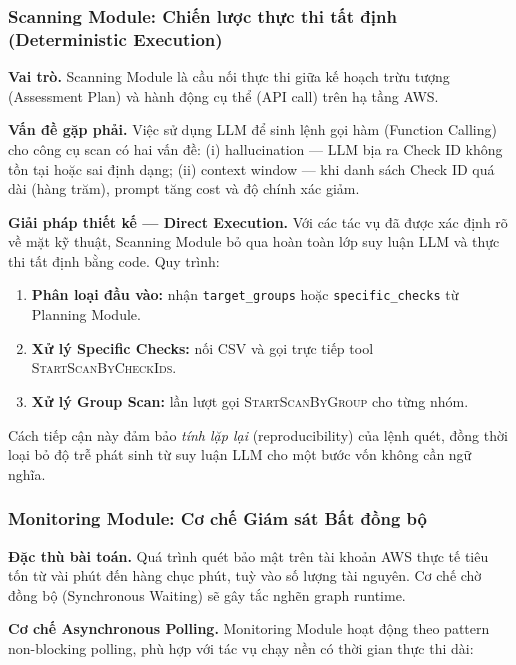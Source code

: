 \subsubsection*{Scanning Module: Chiến lược thực thi tất định (Deterministic Execution)}
\label{subsec:scanner_module}
\label{sub:scanner_strategy}

\textbf{Vai trò.} Scanning Module là cầu nối thực thi giữa kế hoạch trừu tượng (Assessment Plan) và hành động cụ thể (API call) trên hạ tầng AWS.

\textbf{Vấn đề gặp phải.} Việc sử dụng LLM để sinh lệnh gọi hàm (Function Calling) cho công cụ scan có hai vấn đề: (i) hallucination — LLM bịa ra Check ID không tồn tại hoặc sai định dạng; (ii) context window — khi danh sách Check ID quá dài (hàng trăm), prompt tăng cost và độ chính xác giảm.

\textbf{Giải pháp thiết kế --- Direct Execution.} Với các tác vụ đã được xác định rõ về mặt kỹ thuật, Scanning Module bỏ qua hoàn toàn lớp suy luận LLM và thực thi tất định bằng code. Quy trình:

\begin{enumerate}
  \item \textbf{Phân loại đầu vào:} nhận \texttt{target\_groups} hoặc \texttt{specific\_checks} từ Planning Module.
  \item \textbf{Xử lý Specific Checks:} nối CSV và gọi trực tiếp tool \textsc{StartScanByCheckIds}.
  \item \textbf{Xử lý Group Scan:} lần lượt gọi \textsc{StartScanByGroup} cho từng nhóm.
\end{enumerate}

Cách tiếp cận này đảm bảo \textit{tính lặp lại} (reproducibility) của lệnh quét, đồng thời loại bỏ độ trễ phát sinh từ suy luận LLM cho một bước vốn không cần ngữ nghĩa.

\subsubsection*{Monitoring Module: Cơ chế Giám sát Bất đồng bộ}
\label{sub:monitoring_mechanism}

\textbf{Đặc thù bài toán.} Quá trình quét bảo mật trên tài khoản AWS thực tế tiêu tốn từ vài phút đến hàng chục phút, tuỳ vào số lượng tài nguyên. Cơ chế chờ đồng bộ (Synchronous Waiting) sẽ gây tắc nghẽn graph runtime.

\textbf{Cơ chế Asynchronous Polling.} Monitoring Module hoạt động theo pattern non-blocking polling, phù hợp với tác vụ chạy nền có thời gian thực thi dài:

